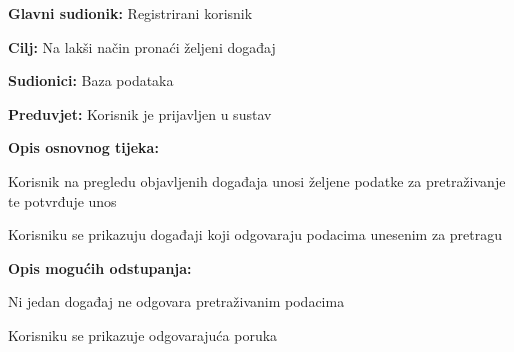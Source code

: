 				
				\noindent {}
				\begin{packed_item}
					
					\item \textbf{Glavni sudionik:} Registrirani korisnik
					\item  \textbf{Cilj:} Na lakši način pronaći željeni događaj
					\item  \textbf{Sudionici:} Baza podataka
					\item  \textbf{Preduvjet:} Korisnik je prijavljen u sustav
					\item  \textbf{Opis osnovnog tijeka:}
					
					\item[] \begin{packed_enum}
						
						\item Korisnik na pregledu objavljenih događaja unosi željene podatke za pretraživanje te potvrđuje unos
						\item Korisniku se prikazuju događaji koji odgovaraju podacima unesenim za pretragu
						
					\end{packed_enum}
					
					\item  \textbf{Opis mogućih odstupanja:}
					
					\item[] \begin{packed_item}
						
						\item[2.a] Ni jedan događaj ne odgovara pretraživanim podacima
						\item[] \begin{packed_enum}
							
							\item Korisniku se prikazuje odgovarajuća poruka
							
						\end{packed_enum}
						
					\end{packed_item}
				\end{packed_item}
				
